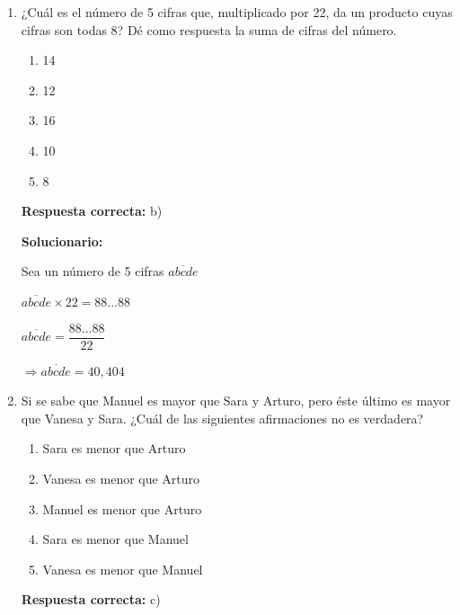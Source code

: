 \begin{enumerate}[resume]
	
	
	$\dfrac{x}{4}-\dfrac{x}{5}=3$
	
	
	\vspace{6mm}
	
	\item ¿Cuál es el número de 5 cifras que, multiplicado por 22, da un producto cuyas cifras son todas 8? Dé como respuesta la suma de cifras del número.
	\begin{enumerate}[label=\alph*)]
		\item 14
		\item 12
		\item 16
		\item 10
		\item 8
	\end{enumerate}
	\textbf{Respuesta correcta:} b)
	
	\vspace{2mm}
	\textbf{Solucionario:}
	
	Sea un número de 5 cifras $\overline{abcde}$
	
	$\overline{abcde}\times 22=88\ldots 88$
	
	
	$\overline{abcde}=\dfrac{88\ldots 88}{22}$
	
	\begin{center}
		\(
	\Rightarrow \overline{abcde}=40,404
		\)
	\end{center}
	
	
	
	\vspace{6mm}
	
	\item Si se sabe que Manuel es mayor que Sara y Arturo, pero éste último es mayor que Vanesa y Sara. ¿Cuál de las siguientes afirmaciones no es verdadera?
	\begin{enumerate}[label=\alph*)]
		\item Sara es menor que Arturo
		\item Vanesa es menor que Arturo
		\item Manuel es menor que Arturo
		\item Sara es menor que Manuel
		\item Vanesa es menor que Manuel
	\end{enumerate}
	\textbf{Respuesta correcta:} c)
	

\end{enumerate}
